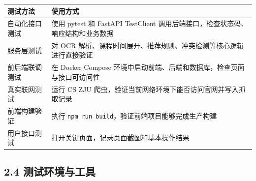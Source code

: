 {\def\LTcaptype{none} %
\begin{longtable}[]{@{}|
  >{\raggedright\arraybackslash}p{}|
  >{\raggedright\arraybackslash}p{}|@{}}
\hline
\rowcolor{gray!12}
\begin{minipage}[b]{\linewidth}\raggedright
\bfseries 测试方法
\end{minipage} & \begin{minipage}[b]{\linewidth}\raggedright
\bfseries 使用方式
\end{minipage} \\
\hline
\endhead
\hline
\endlastfoot
自动化接口测试 & 使用 pytest 和 FastAPI TestClient
调用后端接口，检查状态码、响应结构和业务数据 \\
\hline
服务层测试 & 对 OCR
解析、课程时间展开、推荐规则、冲突检测等核心逻辑进行直接验证 \\
\hline
前后端联调测试 & 在 Docker Compose
环境中启动前端、后端和数据库，检查页面与接口可访问性 \\
\hline
真实联网测试 & 运行 CS ZJU
爬虫，验证当前网络环境下能否访问官网并写入抓取记录 \\
\hline
前端构建验证 & 执行
\passthrough{\lstinline!npm run build!}，验证前端项目能够完成生产构建 \\
\hline
用户接口测试 & 打开关键页面，记录页面截图和基本操作结果 \\
\hline
\end{longtable}
}

\subsection{2.4
测试环境与工具}\label{ux6d4bux8bd5ux73afux5883ux4e0eux5de5ux5177}

